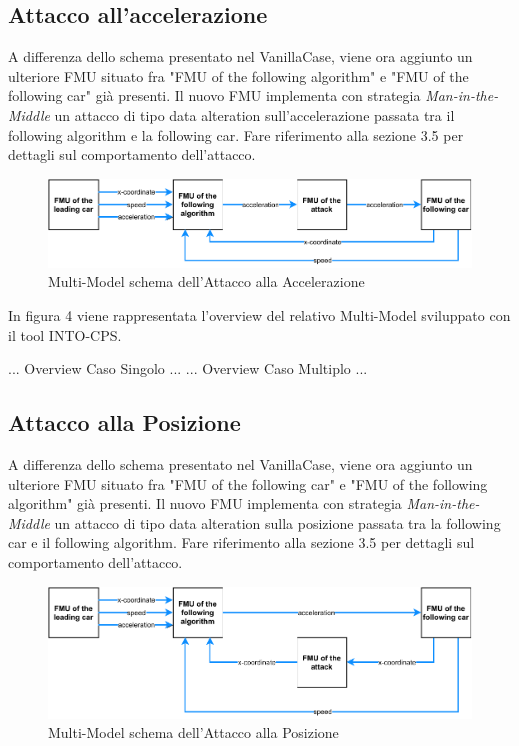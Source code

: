 \subsection{Attacco all'accelerazione}
A differenza dello schema presentato nel VanillaCase, viene ora aggiunto un ulteriore FMU situato fra "FMU of the following algorithm" e "FMU of the following car" già presenti. Il nuovo FMU implementa con strategia \textit{Man-in-the-Middle} un attacco di tipo data alteration sull'accelerazione passata tra il following algorithm e la following car. Fare riferimento alla sezione 3.5 per dettagli sul comportamento dell'attacco.
\begin{figure}[H]
	\centering
	\includegraphics{img/AccelAttackSchema.pdf}
	\caption{Multi-Model schema dell'Attacco alla Accelerazione}
\end{figure}

In figura 4 viene rappresentata l'overview del relativo Multi-Model sviluppato con il tool INTO-CPS. 

... Overview Caso Singolo ...
... Overview Caso Multiplo ...


\subsection{Attacco alla Posizione }
A differenza dello schema presentato nel VanillaCase, viene ora aggiunto un ulteriore FMU situato fra "FMU of the following car" e "FMU of the following algorithm" già presenti. Il nuovo FMU implementa con strategia \textit{Man-in-the-Middle} un attacco di tipo data alteration sulla posizione passata tra la following car e il following algorithm. Fare riferimento alla sezione 3.5 per dettagli sul comportamento dell'attacco.

\begin{figure}[H]
	\centering
	\includegraphics{img/XAttackSchema.pdf}
	\caption{Multi-Model schema dell'Attacco alla Posizione}
\end{figure}


